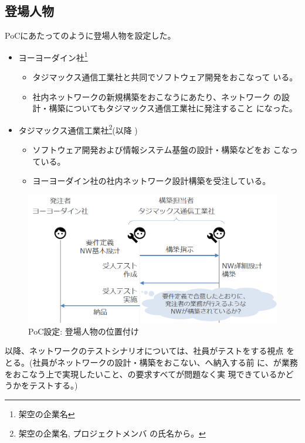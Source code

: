   \subsection{登場人物}
  \label{sec:poc-casting}

PoCにあたってのように登場人物を設定した。
\begin{itemize}
 \item ヨーヨーダイン社\footnote{架空の企業名\cite{yoyodyne}}
       \begin{itemize}
        \item タジマックス通信工業社と共同でソフトウェア開発をおこなって
              いる。
        \item 社内ネットワークの新規構築をおこなうにあたり、ネットワーク
              の設計・構築についてもタジマックス通信工業社に発注すること
              になった。
       \end{itemize}
 \item タジマックス通信工業社\footnote{架空の企業名, プロジェクトメンバ
       の氏名から。}(以降 \tj )
       \begin{itemize}
        \item ソフトウェア開発および情報システム基盤の設計・構築などをお
              こなっている。
        \item ヨーヨーダイン社の社内ネットワーク設計構築を受注している。
       \end{itemize}
\end{itemize}

\begin{figure}[h]
 \centering
 \includegraphics[scale=0.5]{img/poc-situation.png}
 \caption{PoC設定: 登場人物の位置付け}
 \label{fig:poc-situation}
\end{figure}

以降、ネットワークのテストシナリオについては、\tj 社員がテストをする視点
をとる。(\tj 社員がネットワークの設計・構築をおこない、\yo へ納入する前
に、\yo が業務をおこなう上で実現したいこと、\yo の要求すべてが問題なく実
現できているかどうかをテストする。)

